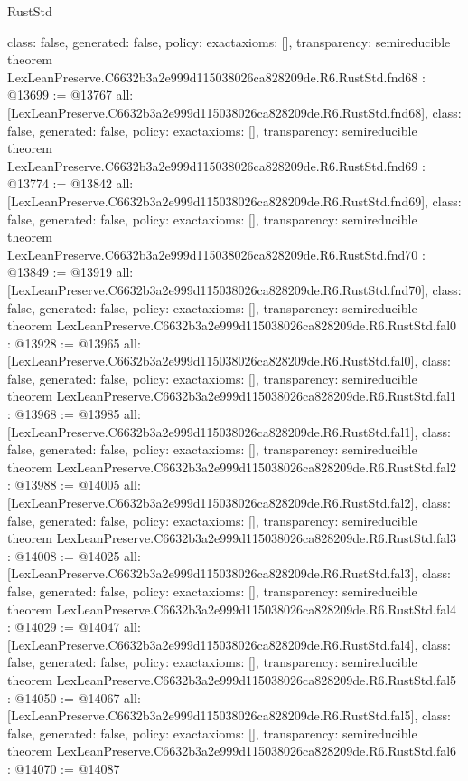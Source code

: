 \begin{lexlean}{RustStd}
\begin{coremodule}
{  class: false,
  generated: false,
  policy: exact{axioms: []},
  transparency: semireducible
}
theorem LexLeanPreserve.C6632b3a2e999d115038026ca828209de.R6.RustStd.fnd68 : @13699 := @13767 {
  all: [LexLeanPreserve.C6632b3a2e999d115038026ca828209de.R6.RustStd.fnd68],
  class: false,
  generated: false,
  policy: exact{axioms: []},
  transparency: semireducible
}
theorem LexLeanPreserve.C6632b3a2e999d115038026ca828209de.R6.RustStd.fnd69 : @13774 := @13842 {
  all: [LexLeanPreserve.C6632b3a2e999d115038026ca828209de.R6.RustStd.fnd69],
  class: false,
  generated: false,
  policy: exact{axioms: []},
  transparency: semireducible
}
theorem LexLeanPreserve.C6632b3a2e999d115038026ca828209de.R6.RustStd.fnd70 : @13849 := @13919 {
  all: [LexLeanPreserve.C6632b3a2e999d115038026ca828209de.R6.RustStd.fnd70],
  class: false,
  generated: false,
  policy: exact{axioms: []},
  transparency: semireducible
}
theorem LexLeanPreserve.C6632b3a2e999d115038026ca828209de.R6.RustStd.fal0 : @13928 := @13965 {
  all: [LexLeanPreserve.C6632b3a2e999d115038026ca828209de.R6.RustStd.fal0],
  class: false,
  generated: false,
  policy: exact{axioms: []},
  transparency: semireducible
}
theorem LexLeanPreserve.C6632b3a2e999d115038026ca828209de.R6.RustStd.fal1 : @13968 := @13985 {
  all: [LexLeanPreserve.C6632b3a2e999d115038026ca828209de.R6.RustStd.fal1],
  class: false,
  generated: false,
  policy: exact{axioms: []},
  transparency: semireducible
}
theorem LexLeanPreserve.C6632b3a2e999d115038026ca828209de.R6.RustStd.fal2 : @13988 := @14005 {
  all: [LexLeanPreserve.C6632b3a2e999d115038026ca828209de.R6.RustStd.fal2],
  class: false,
  generated: false,
  policy: exact{axioms: []},
  transparency: semireducible
}
theorem LexLeanPreserve.C6632b3a2e999d115038026ca828209de.R6.RustStd.fal3 : @14008 := @14025 {
  all: [LexLeanPreserve.C6632b3a2e999d115038026ca828209de.R6.RustStd.fal3],
  class: false,
  generated: false,
  policy: exact{axioms: []},
  transparency: semireducible
}
theorem LexLeanPreserve.C6632b3a2e999d115038026ca828209de.R6.RustStd.fal4 : @14029 := @14047 {
  all: [LexLeanPreserve.C6632b3a2e999d115038026ca828209de.R6.RustStd.fal4],
  class: false,
  generated: false,
  policy: exact{axioms: []},
  transparency: semireducible
}
theorem LexLeanPreserve.C6632b3a2e999d115038026ca828209de.R6.RustStd.fal5 : @14050 := @14067 {
  all: [LexLeanPreserve.C6632b3a2e999d115038026ca828209de.R6.RustStd.fal5],
  class: false,
  generated: false,
  policy: exact{axioms: []},
  transparency: semireducible
}
theorem LexLeanPreserve.C6632b3a2e999d115038026ca828209de.R6.RustStd.fal6 : @14070 := @14087 {
}
\end{coremodule}
\end{lexlean}
